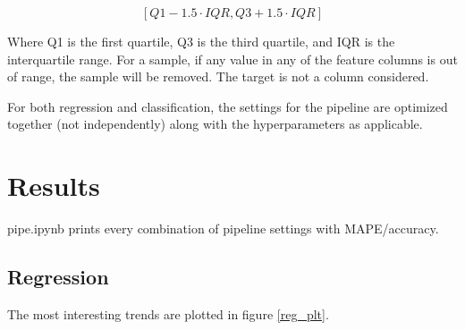 \documentclass[12pt, letterpaper]{article}
\begin{document}
$$
[Q1 - 1.5 \cdot IQR, Q3 + 1.5 \cdot IQR]
$$

Where Q1 is the first quartile, Q3 is the third quartile, and IQR is the interquartile range. For a sample, if any value in any of the feature columns is out of range, the sample will be removed. The target is not a column considered.

For both regression and classification, the settings for the pipeline are optimized together (not independently) along with the hyperparameters as applicable.

\section{Results} %

pipe.ipynb prints every combination of pipeline settings with MAPE/accuracy.

\subsection{Regression}

The most interesting trends are plotted in figure \ref{reg_plt}.
\end{document}
